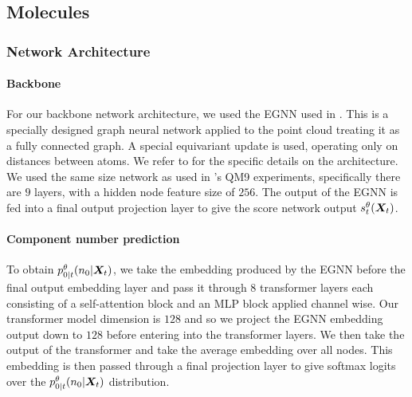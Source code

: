 \subsection{Molecules}

\subsubsection{Network Architecture}
\paragraph{Backbone}
For our backbone network architecture, we used the EGNN used in \cite{hoogeboom2022equivariant}. This is a specially designed graph neural network applied to the point cloud treating it as a fully connected graph. A special equivariant update is used, operating only on distances between atoms. We refer to \cite{hoogeboom2022equivariant} for the specific details on the architecture. We used the same size network as used in \cite{hoogeboom2022equivariant}'s QM9 experiments, specifically there are $9$ layers, with a hidden node feature size of $256$. The output of the EGNN is fed into a final output projection layer to give the score network output $s_t^\theta({\bm{X}}_t)$.

\paragraph{Component number prediction}
To obtain $p_{0|t}^\theta(n_0 | {\bm{X}}_t)$,  we take the embedding produced by the EGNN before the final output embedding layer and pass it through 8 transformer layers each consisting of a self-attention block and an MLP block applied channel wise. Our transformer model dimension is $128$ and so we project the EGNN embedding output down to $128$ before entering into the transformer layers. We then take the output of the transformer and take the average embedding over all nodes. This embedding is then passed through a final projection layer to give softmax logits over the $p_{0|t}^\theta(n_0 | {\bm{X}}_t)$ distribution.

